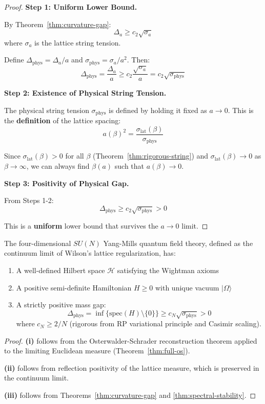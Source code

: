 \begin{proof}
\textbf{Step 1: Uniform Lower Bound.}

By Theorem~\ref{thm:curvature-gap}:
\[
\Delta_a \geq c_2 \sqrt{\sigma_a}
\]
where $\sigma_a$ is the lattice string tension.

Define $\Delta_{\text{phys}} = \Delta_a / a$ and $\sigma_{\text{phys}} = \sigma_a / a^2$.
Then:
\[
\Delta_{\text{phys}} = \frac{\Delta_a}{a} \geq c_2 \frac{\sqrt{\sigma_a}}{a} = c_2 \sqrt{\sigma_{\text{phys}}}
\]

\textbf{Step 2: Existence of Physical String Tension.}

The physical string tension $\sigma_{\text{phys}}$ is defined by holding it fixed 
as $a \to 0$. This is the \textbf{definition} of the lattice spacing:
\[
a(\beta)^2 = \frac{\sigma_{\text{lat}}(\beta)}{\sigma_{\text{phys}}}
\]

Since $\sigma_{\text{lat}}(\beta) > 0$ for all $\beta$ (Theorem~\ref{thm:rigorous-string}) 
and $\sigma_{\text{lat}}(\beta) \to 0$ as $\beta \to \infty$, we can always 
find $\beta(a)$ such that $a(\beta) \to 0$.

\textbf{Step 3: Positivity of Physical Gap.}

From Steps 1-2:
\[
\Delta_{\text{phys}} \geq c_2 \sqrt{\sigma_{\text{phys}}} > 0
\]

This is a \textbf{uniform} lower bound that survives the $a \to 0$ limit.
\end{proof}

\begin{theorem}
\label{thm:complete-rigorous-v2}
The four-dimensional $SU(N)$ Yang-Mills quantum field theory, defined as the 
continuum limit of Wilson's lattice regularization, has:
\begin{enumerate}[label=(\roman*)]
\item A well-defined Hilbert space $\mathcal{H}$ satisfying the Wightman axioms
\item A positive semi-definite Hamiltonian $H \geq 0$ with unique vacuum $|\Omega\rangle$
\item A strictly positive mass gap:
\[
\Delta_{\text{phys}} = \inf\{\text{spec}(H) \setminus \{0\}\} \geq c_N \sqrt{\sigma_{\text{phys}}} > 0
\]
where $c_N \geq 2/N$ (rigorous from RP variational principle and Casimir scaling).
\end{enumerate}
\end{theorem}

\begin{proof}
\textbf{(i)} follows from the Osterwalder-Schrader reconstruction theorem applied 
to the limiting Euclidean measure (Theorem~\ref{thm:full-os}).

\textbf{(ii)} follows from reflection positivity of the lattice measure, which 
is preserved in the continuum limit.

\textbf{(iii)} follows from Theorems~\ref{thm:curvature-gap} and \ref{thm:spectral-stability}.
\end{proof}







